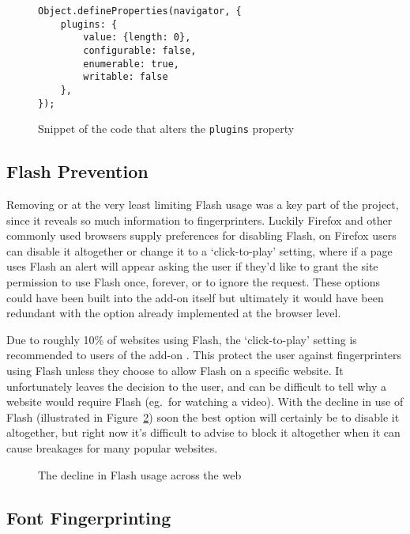 \begin{figure}[h!]
\begin{lstlisting}
Object.defineProperties(navigator, {
    plugins: {
        value: {length: 0},
        configurable: false,
        enumerable: true,
        writable: false
    },
});
\end{lstlisting}
\caption{Snippet of the code that alters the \texttt{plugins} property}
\label{lst:plugins}
\end{figure}

\subsection{Flash Prevention}

Removing or at the very least limiting Flash usage was a key part of the project, since it reveals so much information to fingerprinters.
Luckily Firefox and other commonly used browsers supply preferences for disabling Flash, on Firefox users can disable it altogether or change it to a `click-to-play' setting, where if a page uses Flash an alert will appear asking the user if they'd like to grant the site permission to use Flash once, forever, or to ignore the request.
These options could have been built into the add-on itself but ultimately it would have been redundant with the option already implemented at the browser level.

Due to roughly 10\% of websites using Flash, the `click-to-play' setting is recommended to users of the add-on \citep{flash-usage}.
This protect the user against fingerprinters using Flash unless they choose to allow Flash on a specific website.
It unfortunately leaves the decision to the user, and can be difficult to tell why a website would require Flash (eg.\ for watching a video).
With the decline in use of Flash (illustrated in Figure~\ref{fig:flash-usage}) soon the best option will certainly be to disable it altogether, but right now it's difficult to advise to block it altogether when it can cause breakages for many popular websites.

\begin{figure}[h!]
\centering
\caption{The decline in Flash usage across the web}
\label{fig:flash-usage}
\end{figure}

\subsection{Font Fingerprinting}

